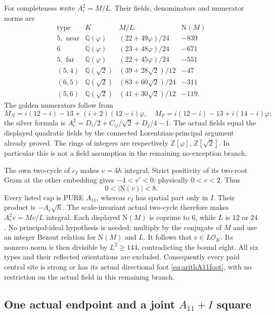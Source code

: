 \documentclass[11pt]{article}
\begin{document}
For completeness write \(A_c^2=M/L\).
Their fields, denominators and numerator
norms are
\[
 \begin{array}{c|c|c|r}
 \text{type}&K&M/L&\mathrm N(M)\\ \hline
 5,\text{ near}&\mathbb Q(\varphi)&(22+49\varphi)/24&-839\\
 6&\mathbb Q(\varphi)&(23+48\varphi)/24&-671\\
 5,\text{ far}&\mathbb Q(\varphi)&(22+45\varphi)/24&-551\\
 (5,4)&\mathbb Q(\sqrt2)&(39+28\sqrt2)/12&-47\\
 (6,5)&\mathbb Q(\sqrt2)&(83+60\sqrt2)/24&-311\\
 (5,6)&\mathbb Q(\sqrt2)&(41+30\sqrt2)/12&-119 .
 \end{array}
\]
The golden numerators follow from
\[
 M_N=i(12-i)-13+(i+2)(12-i)\varphi,\quad
 M_F=i(12-i)-13+i(14-i)\varphi;
\]
the silver formula is
\(A_c^2=D_i/2+C_{ij}/\sqrt2+D_j/4-1\).
The actual fields equal the displayed quadratic
fields by the connected Lorentzian-principal
argument already proved.
The rings of integers are respectively
\(\mathbb Z[\varphi]\), \(\mathbb Z[\sqrt2]\).
In particular this is not a field assumption
in the remaining no-exception branch.

The own two-cycle of \(c_I\) makes
\(v=4h\) integral.
Strict positivity of its two-root Gram at the
other embedding gives \(-4<v'<0\);
physically \(0<v<2\).
Thus
\[
                        0<|\mathrm N(v)|<8 .
\]
Every listed cap is PURE \(A_{11}\), whereas
\(c_I\) has spatial part only in \(I\).
Their product is \(-A_c\sqrt h\).
The scale-invariant actual two-cycle therefore
makes \(A_c^2v=Mv/L\) integral.
Each displayed \(\mathrm N(M)\) is coprime
to \(6\), while \(L\) is \(12\) or \(24\).
No principal-ideal hypothesis is needed:
multiply by the conjugate of \(M\) and use
an integer Bezout relation for
\(\mathrm N(M)\) and \(L\).
It follows that \(v\in L\mathcal O_K\).
Its nonzero norm is then divisible by
\(L^2\ge144\), contradicting the bound eight.
All six types and their reflected orientations
are excluded.
Consequently every paid central site is
strong or has its actual directional foot
\eqref{eq:arithA11foot}, with no restriction
on the actual field in this remaining branch.

\subsection{One actual endpoint and a joint \(A_{11}+I\) square}
\label{app:arithA11Ijoint}
\end{document}
